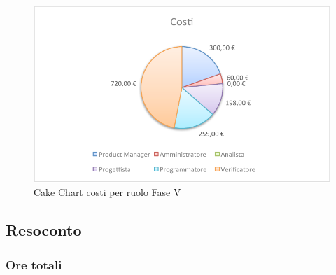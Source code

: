 				\begin{figure}[H]\centering
					\includegraphics[width=\textwidth]{PianoDiProgetto/Pics/ChartTotCostiFaseV.pdf}
					\caption{Cake Chart costi per ruolo Fase V}
				\end{figure}
	\subsection{Resoconto}
	\subsubsection{Ore totali}			
